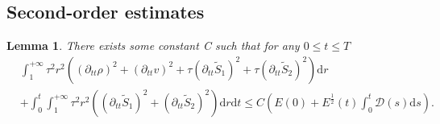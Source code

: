 \documentclass[10pt,reqno]{amsart}
\numberwithin{equation}{section}
\newtheorem{lemma}[theorem]{Lemma}
\begin{document}
	\subsection{Second-order estimates}
	\begin{lemma}\label{lem3}
		There exists some constant C such that for any $0\le t \le T$
		\begin{equation}
			\begin{aligned}
				&\int_{1}^{+\infty} \tau^2r^2 \left((\partial_{tt}\rho)^2+(\partial_{tt}v)^2+\tau(\partial_{tt}\tilde{S}_1)^2+\tau(\partial_{tt}\tilde{S}_2)^2\right) \mathrm{d} r \\
				&+\int_0^t \int_{1}^{+\infty}\tau^2r^2\left((\partial_{tt}\tilde{S}_1)^2+(\partial_{tt}\tilde{S}_2)^2\right) \mathrm{d} r \mathrm{d} t 
				\leq C\left(E(0)+ E^{\frac{1}{2}}(t) \int_{0}^t \mathcal{D}(s)\mathrm{d}s\right).
			\end{aligned}
		\end{equation}
	\end{lemma}
\end{document}
